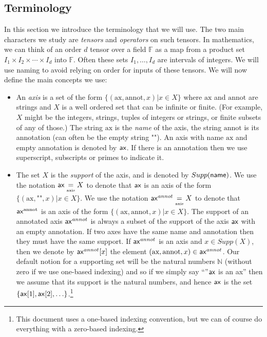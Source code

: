 \documentclass{article}
\newcommand{\defaxis}{\underset{\text{\tiny axis}}{=}}
\begin{document}
\subsection{Terminology}

In this section we introduce the terminology that we will use.
The two main characters we study are \emph{tensors} and \emph{operators} on such tensors.
In mathematics, we can think of an order $d$ tensor over a field $\mathbb{F}$ as a map from a product set $I_1 \times I_2 \times \cdots \times I_d$ into $\mathbb{F}$. Often these sets $I_1,\ldots,I_d$ are intervals of  integers.
We will use naming to avoid relying on order for inputs of these tensors.
We will now define the main concepts we use:

\begin{itemize}

  
  \item An \emph{axis} is a set of the form $\{ (\text{ax} ,\text{annot},x) | x\in X \}$ where $\text{ax}$ and $\text{annot}$ are strings and $X$ is a well ordered set that can be infinite or finite. (For example, $X$ might be the integers, strings, tuples of integers or strings, or finite subsets of any of those.)   The string $\text{ax}$ is the \emph{name} of the axis, the string $\text{annot}$ is its annotation (can often be the empty string $\text{""}$). An axis with name $\text{ax}$ and empty annotation is denoted by $\mathsf{ax}$. If there is an annotation then we use superscript, subscripts or primes to indicate it. 
  
  
  \item The  set $X$ is the \emph{support} of the axis, and is denoted by $Supp(\mathsf{name})$.  We use the notation $\name{ax} \defaxis X$ to denote that $\mathsf{ax}$ is an axis of the form $\{ (\text{ax},\text{""},x) | x\in  X \}$.  We use the notation $\name{ax}^{annot} \defaxis X$ to denote that $\mathsf{ax}^{\text{annot}}$ is an axis of the form $\{(\text{ax},\text{annot},x) | x\in X \}$. The support of an annotated axis $\mathsf{ax}^{annot}$ is always a subset of the support of the axis $\mathsf{ax}$ with an empty annotation.  If two axes have the same name and annotation then they must have the same support. If $\mathsf{ax}^{annot}$ is an axis and $x \in Supp(X)$, then we denote by $\mathsf{ax}^{annot}[x]$ the element $(\text{ax},\text{annot},x) \in \mathsf{ax}^{annot}$.  Our default notion for a supporting set will be the natural numbers $\mathbb{N}$ (without zero if we use one-based indexing) and so if we simply say ``''$\mathsf{ax}$ is an ax'' then we assume that its support is the natural numbers, and hence $\mathsf{ax}$ is the set $\{ \mathsf{ax}[1],\mathsf{ax}[2],\ldots \}$.\footnote{This document uses a one-based indexing convention, but we can of course do everything with a zero-based indexing.} 



\end{itemize}
\end{document}
